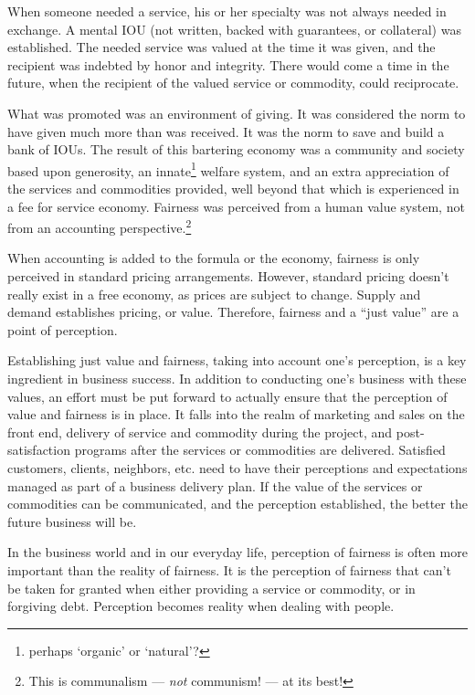 \documentclass[12pt]{memoir}
\begin{document}
When someone needed a service, his or her specialty was not always needed in exchange. A mental \textsc{IOU} (not written, backed with guarantees, or collateral) was established. The needed service was valued at the time it was given, and the recipient was indebted by honor and integrity. There would come a time in the future, when
the recipient of the valued service or commodity, could reciprocate.

What was promoted was an environment of giving. It was considered
the norm to have given much more than was received. It was the norm to save and build a bank of IOUs. The result of this bartering economy was a community and society based upon generosity, an innate\footnote{perhaps `organic' or `natural'?} welfare system, and an extra appreciation of the services and commodities provided, well beyond that which is experienced in a fee for service economy. Fairness was perceived from a human value system, not from an accounting perspective.\footnote{This is communalism --- \emph{not} communism! --- at its best!}

When accounting is added to the formula or the economy, fairness is
only perceived in standard pricing arrangements. However, standard
pricing doesn't really exist in a free economy, as prices are subject
to change. Supply and demand establishes pricing, or value. Therefore,
fairness and a ``just value'' are a point of perception. 

Establishing just value and fairness, taking into account one's perception, is a key ingredient
in business success. In addition to conducting one's business with
these values, an effort must be put forward to actually ensure that
the perception of value and fairness is in place. It falls into the
realm of marketing and sales on the front end, delivery of service
and commodity during the project, and post-satisfaction programs after the services or commodities are delivered. Satisfied customers,
clients, neighbors, etc. need to have their perceptions and expectations
managed as part of a business delivery plan. If the value of the services
or commodities can be communicated, and the perception established,
the better the future business will be. 

In the business world and in our everyday life, perception of fairness
is often more important than the reality of fairness. It is the perception
of fairness that can't be taken for granted when either providing
a service or commodity, or in forgiving debt. Perception becomes reality
when dealing with people. 
\end{document}
